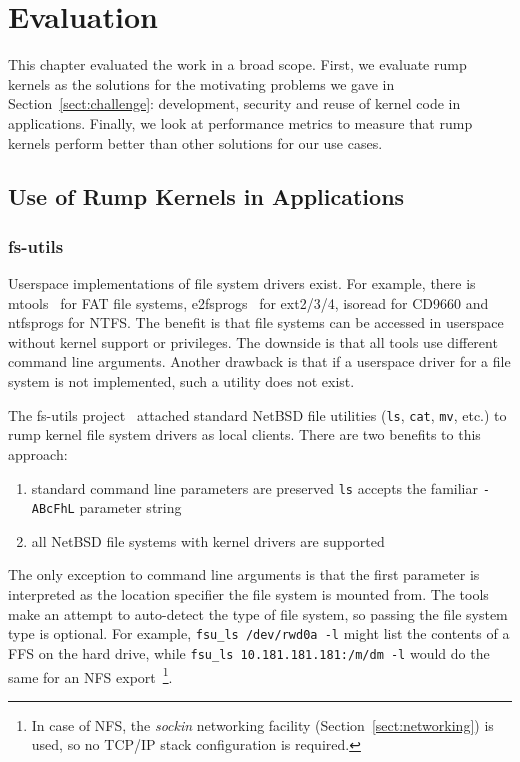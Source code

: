 
\section{Evaluation}
\label{chap:evaluation}

This chapter evaluated the work in a broad scope. First, we evaluate
rump kernels as the solutions for the motivating problems we gave in
Section~\ref{sect:challenge}: development, security and reuse of kernel
code in applications.  Finally, we look at performance metrics to measure
that rump kernels perform better than other solutions for our use cases.


\subsection{Use of Rump Kernels in Applications}

\subsubsection{fs-utils}
\label{sect:fs-utils}

Userspace implementations of file system drivers
exist.  For example, there is mtools~\cite{mtools} for FAT
file systems, e2fsprogs~\cite{e2fsprogs} for ext2/3/4, isoread for
CD9660 and ntfsprogs for NTFS.  The benefit is that file systems
can be accessed in userspace without kernel support or privileges.
The downside is that all tools use different command line arguments.
Another drawback is that if a userspace driver for a file system
is not implemented, such a utility does not exist.

The fs-utils project~\cite{ysmal:fs-utils} attached standard NetBSD
file utilities (\texttt{ls}, \texttt{cat}, \texttt{mv}, etc.) to rump
kernel file system drivers as local clients.  There are two benefits
to this approach:

\begin{enumerate}
\item standard command line parameters are preserved \ie \texttt{ls}
accepts the familiar \texttt{-ABcFhL} parameter string

\item all NetBSD file systems with kernel drivers are supported
\end{enumerate}

The only exception to command line arguments is that the first parameter
is interpreted as the location specifier the file system is mounted from.
The tools make an attempt to auto-detect the type of file system, so passing the file system
type is optional.  For example, \verb+fsu_ls /dev/rwd0a -l+ might list
the contents of
a FFS on the hard drive, while \verb+fsu_ls 10.181.181.181:/m/dm -l+
would do the same for an NFS
export~\footnote
{
	In case of NFS, the \textit{sockin} networking facility
	(Section~\ref{sect:networking}) is used, so no TCP/IP stack
	configuration is required.
}.

